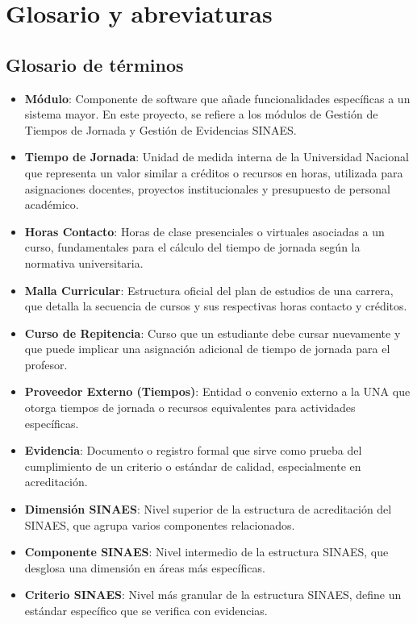 \section*{Glosario y abreviaturas}

\subsection*{Glosario de términos}
\begin{itemize}
    \item \textbf{Módulo}: Componente de software que añade funcionalidades específicas a un sistema mayor. En este proyecto, se refiere a los módulos de Gestión de Tiempos de Jornada y Gestión de Evidencias SINAES.
    \item \textbf{Tiempo de Jornada}: Unidad de medida interna de la Universidad Nacional que representa un valor similar a créditos o recursos en horas, utilizada para asignaciones docentes, proyectos institucionales y presupuesto de personal académico.
    \item \textbf{Horas Contacto}: Horas de clase presenciales o virtuales asociadas a un curso, fundamentales para el cálculo del tiempo de jornada según la normativa universitaria.
    \item \textbf{Malla Curricular}: Estructura oficial del plan de estudios de una carrera, que detalla la secuencia de cursos y sus respectivas horas contacto y créditos.
    \item \textbf{Curso de Repitencia}: Curso que un estudiante debe cursar nuevamente y que puede implicar una asignación adicional de tiempo de jornada para el profesor.
    \item \textbf{Proveedor Externo (Tiempos)}: Entidad o convenio externo a la UNA que otorga tiempos de jornada o recursos equivalentes para actividades específicas.
    \item \textbf{Evidencia}: Documento o registro formal que sirve como prueba del cumplimiento de un criterio o estándar de calidad, especialmente en acreditación.
    \item \textbf{Dimensión SINAES}: Nivel superior de la estructura de acreditación del SINAES, que agrupa varios componentes relacionados.
    \item \textbf{Componente SINAES}: Nivel intermedio de la estructura SINAES, que desglosa una dimensión en áreas más específicas.
    \item \textbf{Criterio SINAES}: Nivel más granular de la estructura SINAES, define un estándar específico que se verifica con evidencias.

\end{itemize}
